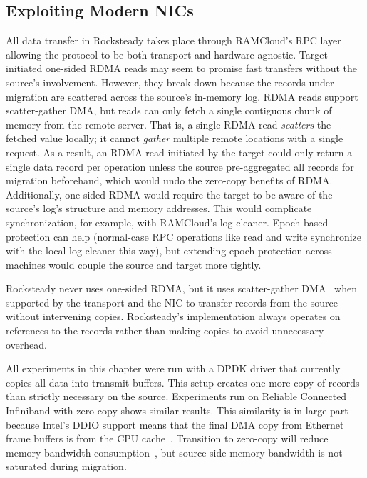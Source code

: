 \subsection{Exploiting Modern NICs}
\label{sec:hw}
All data transfer in Rocksteady takes place through RAMCloud's RPC layer
allowing the protocol to be both transport and hardware agnostic. Target
initiated one-sided RDMA reads may seem to promise fast transfers without the
source's involvement. However, they break down because the records under migration are
scattered across the source's in-memory log. RDMA reads support
scatter-gather DMA, but reads can only fetch a single contiguous chunk of
memory from the remote server. That is, a single RDMA read {\em scatters} the
fetched value locally; it cannot {\em gather} multiple remote locations with a
single request. As a result, an RDMA read initiated by the target could only
return a single data record per operation unless the source
pre-aggregated all records for migration beforehand, which would undo the
zero-copy benefits of RDMA.
Additionally, one-sided RDMA would require the target
to be aware of the source's log's structure and memory addresses. This
would complicate synchronization, for example, with RAMCloud's log cleaner.
Epoch-based protection can help (normal-case RPC operations like read and write
synchronize with the local log cleaner this way), but extending epoch
protection across machines would couple the source and target more
tightly.

Rocksteady never uses one-sided RDMA, but it uses scatter-gather
DMA~\cite{ramcloud} when supported by the transport and the NIC to transfer
records from the source without intervening copies.
Rocksteady's implementation always operates on references to 
the records rather than making copies to avoid
unnecessary overhead.

All experiments in this chapter were run with a DPDK driver that currently
copies all data into transmit buffers. This setup creates one more copy of records
than strictly necessary on the source. Experiments run on Reliable
Connected Infiniband with zero-copy shows
similar results. This similarity is in large part because Intel's DDIO
support means that
the final DMA copy from Ethernet frame buffers is from the CPU
cache~\cite{ddio}.
Transition to zero-copy will reduce memory bandwidth
consumption~\cite{kesavan:copy}, but source-side memory bandwidth is not
saturated during migration.


